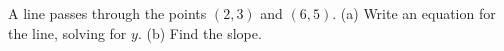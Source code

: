 A line passes through the points $(2,3)$ and $(6,5)$. 
(a) Write an equation for the line, solving for $y$.
(b) Find the slope.\answercheck
